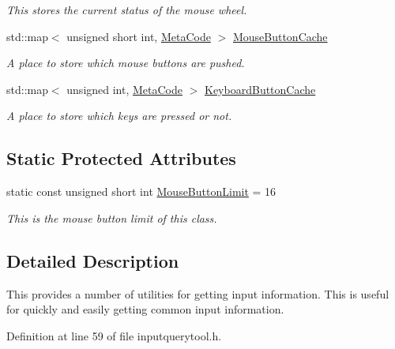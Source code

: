 \begin{DoxyCompactItemize}
\begin{DoxyCompactList}\small\item\em This stores the current status of the mouse wheel. \item\end{DoxyCompactList}\item 
std::map$<$ unsigned short int, \hyperlink{classphys_1_1MetaCode}{MetaCode} $>$ \hyperlink{classphys_1_1InputQueryTool_a2fddedc3d3ac61a195289b55b0aec972}{MouseButtonCache}
\begin{DoxyCompactList}\small\item\em A place to store which mouse buttons are pushed. \item\end{DoxyCompactList}\item 
std::map$<$ unsigned int, \hyperlink{classphys_1_1MetaCode}{MetaCode} $>$ \hyperlink{classphys_1_1InputQueryTool_afd89b917cb11be11dc990d5ef9ddb2ff}{KeyboardButtonCache}
\begin{DoxyCompactList}\small\item\em A place to store which keys are pressed or not. \item\end{DoxyCompactList}\end{DoxyCompactItemize}
\subsection*{Static Protected Attributes}
\begin{DoxyCompactItemize}
\item 
static const unsigned short int \hyperlink{classphys_1_1InputQueryTool_af5d261bc351f43222db511aacf572409}{MouseButtonLimit} = 16
\begin{DoxyCompactList}\small\item\em This is the mouse button limit of this class. \item\end{DoxyCompactList}\end{DoxyCompactItemize}


\subsection{Detailed Description}
This provides a number of utilities for getting input information. This is useful for quickly and easily getting common input information. 

Definition at line 59 of file inputquerytool.h.



